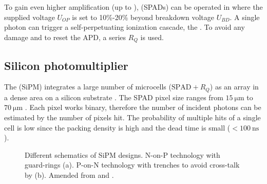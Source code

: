 To gain even higher amplification (up to ),  (SPADs) can be operated in  where the supplied voltage $U_{OP}$ is set to 10\%-20\% beyond breakdown voltage $U_{BD}$. A single photon can trigger a self-perpetuating ionization cascade, the . To avoid any damage and to reset the APD, a series  $R_Q$ is used.  

\subsection{Silicon photomultiplier}

The  (SiPM) integrates a large number of microcells ($\text{SPAD}+R_Q$) as an array in a dense area on a silicon substrate \cite{sensL}. The SPAD pixel size ranges from $\SI{15}{\micro\meter}$ to $\SI{70}{\micro\meter}$ \cite{buzhan}. Each pixel works binary, therefore the number of incident photons can be estimated by the number of pixels hit. The probability of multiple hits of a single cell is low since the packing density is high and the dead time is small ($<\SI{100}{\nano\second}$ \cite{wermes}). \par 
\begin{figure}[b!]
	\hfill
	\hfill
	\caption[SiPM schematics]{Different schematics of SiPM designs. N-on-P technology with guard-rings (a). P-on-N technology with trenches to avoid cross-talk by  (b). Amended from \cite{buzhan} and \cite{ketek}. }
	\label{fig:ch3:sipm_scheme}
\end{figure}

